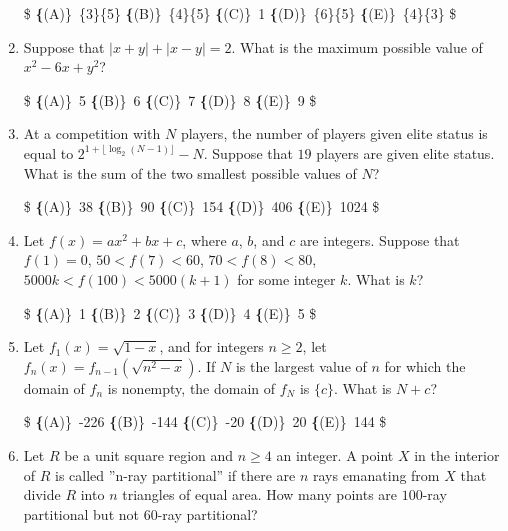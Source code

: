 \documentclass{article}
\begin{document}
\begin{enumerate}[label=\arabic*., itemsep=0.5em]
\$
\textbf\{(A)\}\ \frac\{3\}\{5\} \qquad
\textbf\{(B)\}\ \frac\{4\}\{5\} \qquad
\textbf\{(C)\}\ 1 \qquad
\textbf\{(D)\}\ \frac\{6\}\{5\} \qquad
\textbf\{(E)\}\ \frac\{4\}\{3\} \$\par \vspace{0.5em}\item Suppose that $\left|x+y\right|+\left|x-y\right|=2$. What is the maximum possible value of $x^2-6x+y^2$?

\$
\textbf\{(A)\}\ 5 \qquad
\textbf\{(B)\}\ 6 \qquad
\textbf\{(C)\}\ 7 \qquad
\textbf\{(D)\}\ 8 \qquad
\textbf\{(E)\}\ 9 \$\par \vspace{0.5em}\item At a competition with $N$ players, the number of players given elite status is equal to $2^{1+\lfloor \log_{2} (N-1) \rfloor}-N$. Suppose that $19$ players are given elite status. What is the sum of the two smallest possible values of $N$?

\$
\textbf\{(A)\}\ 38 \qquad
\textbf\{(B)\}\ 90 \qquad
\textbf\{(C)\}\ 154 \qquad
\textbf\{(D)\}\ 406 \qquad
\textbf\{(E)\}\ 1024 \$\par \vspace{0.5em}\item Let $f(x)=ax^2+bx+c$, where $a$, $b$, and $c$ are integers. Suppose that $f(1)=0$, $50<f(7)<60$, $70<f(8)<80$, $5000k<f(100)<5000(k+1)$ for some integer $k$. What is $k$?

\$
\textbf\{(A)\}\ 1 \qquad
\textbf\{(B)\}\ 2 \qquad
\textbf\{(C)\}\ 3 \qquad
\textbf\{(D)\}\ 4 \qquad
\textbf\{(E)\}\ 5 \$\par \vspace{0.5em}\item Let $f_{1}(x)=\sqrt{1-x}$, and for integers $n \geq 2$, let $f_{n}(x)=f_{n-1}(\sqrt{n^2 - x})$. If $N$ is the largest value of $n$ for which the domain of $f_{n}$ is nonempty, the domain of $f_{N}$ is $\{ c\}$. What is $N+c$?

\$
\textbf\{(A)\}\ -226 \qquad
\textbf\{(B)\}\ -144 \qquad
\textbf\{(C)\}\ -20 \qquad
\textbf\{(D)\}\ 20 \qquad
\textbf\{(E)\}\ 144 \$\par \vspace{0.5em}\item Let $R$ be a unit square region and $n \geq 4$ an integer. A point $X$ in the interior of $R$ is called ''n-ray partitional'' if there are $n$ rays emanating from $X$ that divide $R$ into $n$ triangles of equal area. How many points are $100$-ray partitional but not $60$-ray partitional?


\end{enumerate}
\end{document}
